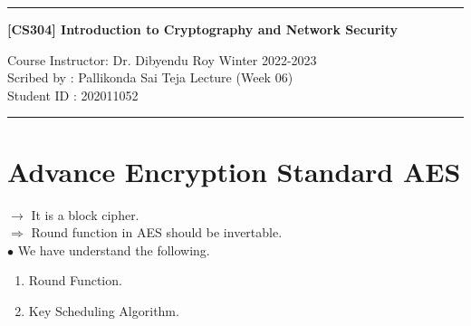 \documentclass[11pt]{article}
\begin{document}
	\noindent
	\rule{\textwidth}{1pt}
	\begin{center}
		{\bf [CS304] Introduction to Cryptography and Network Security}
	\end{center}
	Course Instructor: Dr. Dibyendu Roy \hfill Winter 2022-2023\\
	Scribed by : Pallikonda Sai Teja  \hfill Lecture (Week 06)\\
	Student ID : 202011052\\
	\rule{\textwidth}{1pt}
	
	\section{Advance Encryption Standard AES}
	$\rightarrow$ It is a block cipher.\\
	$\Rightarrow$ Round function in AES should be invertable.\vspace{0.3cm}\\
	$\bullet$ We have understand the following.
	\begin{enumerate}
		\item Round Function.
		\item Key Scheduling Algorithm.
	\end{enumerate}
\end{document}
